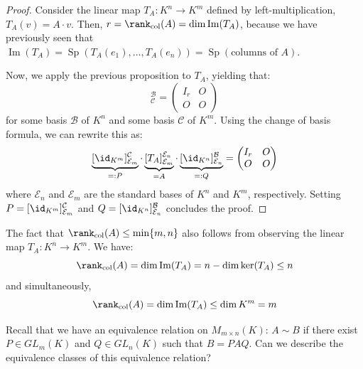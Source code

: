 \begin{proof}
Consider the linear map $T_A: K^n \to K^m$ defined by left-multiplication, $T_A(v) = A \cdot v$. Then, $r = \rank_{\text{col}}(A) = \dim \operatorname{Im}(T_A)$, because we have previously seen that $\operatorname{Im}(T_A) = \operatorname{Sp}(T_A(e_1), \dots, T_A(e_n)) = \operatorname{Sp}(\text{columns of } A)$.

Now, we apply the previous proposition to $T_A$, yielding that:
\begin{equation*}
    [T_A]_{\mathcal{C}}^{\mathcal{B}} = \begin{pmatrix} I_r & O \\ O & O \end{pmatrix}
\end{equation*}
for some basis $\mathcal{B}$ of $K^n$ and some basis $\mathcal{C}$ of $K^m$. Using the change of basis formula, we can rewrite this as:
\begin{equation*}
    \underbrace{[\id_{K^m}]_{\mathcal{E}_m}^{\mathcal{C}}}_{=: P} \cdot \underbrace{[T_A]_{\mathcal{E}_m}^{\mathcal{E}_n}}_{= A} \cdot \underbrace{[\id_{K^n}]_{\mathcal{E}_n}^{\mathcal{B}}}_{=: Q} = \begin{pmatrix} I_r & O \\ O & O \end{pmatrix}
\end{equation*}
where $\mathcal{E}_n$ and $\mathcal{E}_m$ are the standard bases of $K^n$ and $K^m$, respectively. Setting $P = [\id_{K^m}]_{\mathcal{E}_m}^{\mathcal{C}}$ and $Q = [\id_{K^n}]_{\mathcal{E}_n}^{\mathcal{B}}$ concludes the proof.
\end{proof}

\begin{remark}
The fact that $\rank_{\text{col}}(A) \le \min\{m, n\}$ also follows from observing the linear map $T_A: K^n \to K^m$. We have:
\begin{equation*}
    \rank_{\text{col}}(A) = \dim \operatorname{Im}(T_A) = n - \dim \ker(T_A) \le n
\end{equation*}
and simultaneously,
\begin{equation*}
    \rank_{\text{col}}(A) = \dim \operatorname{Im}(T_A) \le \dim K^m = m
\end{equation*}
\end{remark}

\begin{question}
Recall that we have an equivalence relation on $M_{m \times n}(K)$: $A \sim B$ if there exist $P \in GL_m(K)$ and $Q \in GL_n(K)$ such that $B = PAQ$. Can we describe the equivalence classes of this equivalence relation?
\end{question}

